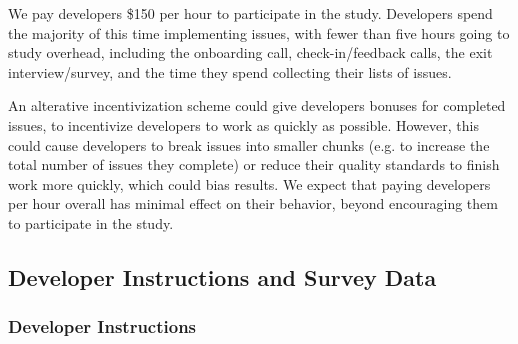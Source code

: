 \documentclass{article}
\begin{document}
We pay developers \$150 per hour to participate in the study. Developers spend the majority of this time implementing issues, with fewer than five hours going to study overhead, including the onboarding call, check-in/feedback calls, the exit interview/survey, and the time they spend collecting their lists of issues.

An alterative incentivization scheme could give developers bonuses for completed issues, to incentivize developers to work as quickly as possible. However, this could cause developers to break issues into smaller chunks (e.g. to increase the total number of issues they complete) or reduce their quality standards to finish work more quickly, which could bias results. We expect that paying developers per hour overall has minimal effect on their behavior, beyond encouraging them to participate in the study.

\subsection{Developer Instructions and Survey Data}
\label{sec:dev_instructions_and_survey_data}

\subsubsection{Developer Instructions}
\label{sec:dev_instructions}
\end{document}
